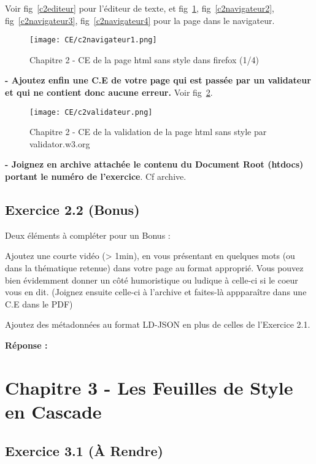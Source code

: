 \documentclass[11pt]{article}
\begin{document}
\medskip

Voir fig~\ref{c2editeur} pour l’éditeur de texte, et fig~\ref{c2navigateur1}, fig~\ref{c2navigateur2}, fig~\ref{c2navigateur3}, fig~\ref{c2navigateur4} pour la page dans le navigateur. 

		
		\begin{figure}[h]
		\texttt{[image: CE/c2navigateur1.png]}
		\caption{Chapitre 2 - CE de la page html sans style dans firefox (1/4)}
		\label{c2navigateur1}
		\end{figure}	

\textbf{- Ajoutez enfin une C.E de votre page qui est passée par un validateur et qui ne contient donc aucune erreur.} Voir fig~\ref{c2validateur}.

		\begin{figure}[h]
		\texttt{[image: CE/c2validateur.png]}
		\caption{Chapitre 2 - CE de la validation de la page html sans style par validator.w3.org}
		\label{c2validateur}
		\end{figure}	

\textbf{- Joignez en archive attachée le contenu du Document Root (htdocs) portant le numéro de l’exercice}. Cf archive.

	\subsection*{Exercice 2.2 (Bonus)}
	
	Deux éléments à compléter pour un Bonus :

Ajoutez une courte vidéo (> 1min), en vous présentant en quelques mots (ou dans la thématique retenue) dans votre page au format approprié. Vous pouvez bien évidemment donner un côté humoristique ou ludique à celle-ci si le coeur vous en dit. (Joignez ensuite celle-ci à l’archive et faites-là appparaître dans une C.E dans le PDF)

Ajoutez des métadonnées au format LD-JSON en plus de celles de l’Exercice 2.1.

\textbf{Réponse :}

\section*{Chapitre 3 - Les Feuilles de Style en Cascade}

	\subsection*{Exercice 3.1 (À Rendre)}
	
\end{document}
